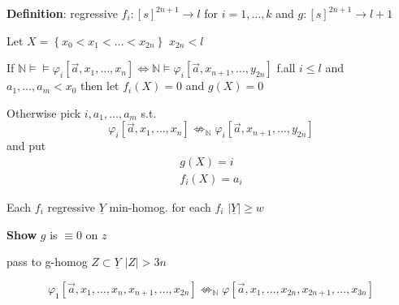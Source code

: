 \documentclass[12pt]{article}
\newcommand{\Nat}{\ensuremath{\mathbb{N}}}
\newcommand{\defn}{\textbf{Definition}: }
\begin{document}
\defn
regressive 
$f_i: [s]^{2n+1} \rightarrow l$ for $i = 1,\dots, k$
and
$g : [s]^{2n+1} \rightarrow l+1$

Let $X = \left\{ x_0 < x_1 < \dots < x_{2n} \right\}$   $x_{2n} < l$

If $\Nat \models \models \varphi_i[\vec{a}, x_1, \dots, x_n] \Leftrightarrow
\Nat \models \varphi_i[\vec{a}, x_{n+1}, \dots, y_{2n}]$
f.all $i \le l$ and  $a_1, \dots, a_m < x_0$
then let $f_i(X) = 0$ and $g(X) = 0$

Otherwise pick $i, a_1, \dots, a_m$ s.t.
\[
\varphi_i[\vec{a}, x_1, \dots, x_n] \not\Leftrightarrow_\Nat
\varphi_i[\vec{a}, x_{n+1}, \dots, y_{2n}]
\]
and put 
\begin{align*}
  g(X) = i \\
  f_i(X) = a_i
\end{align*}


Each $f_i$ regressive
$\underline{Y}$ min-homog. for each $f_i$
$|\underline{Y}| \ge w$

\textbf{Show} $g$ is $\equiv 0$ on $z$

pass to g-homog $Z \subset \underline{Y}$ $|Z| > 3n$

\[
\varphi_1[\vec{a}, x_1, \dots, x_n, x_{n+1}, \dots, x_{2n}] \not\Leftrightarrow_\Nat
\varphi[\vec{a}, x_1, \dots, x_{2n}, x_{2n+1}, \dots, x_{3n}]
\]
\end{document}
